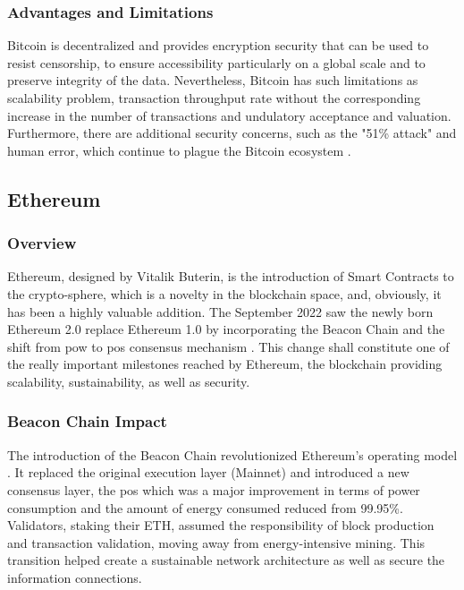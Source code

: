 \subsubsection{Advantages and Limitations}

Bitcoin is decentralized and provides encryption security that can be used to resist censorship, to ensure accessibility particularly on a global scale and to preserve integrity 
of the data. Nevertheless, Bitcoin has such limitations as scalability problem, transaction throughput rate without the corresponding increase in the number of transactions 
and undulatory acceptance and valuation. Furthermore, there are additional security concerns, such as the "51\% attack" and human error, which continue to plague the Bitcoin 
ecosystem \cite{9129332}.

\subsection{Ethereum} \label{subsec:ethereum}

\subsubsection{Overview}

Ethereum, designed by Vitalik Buterin, is the introduction of Smart Contracts to the crypto-sphere, which is a novelty in the blockchain space, and, obviously, it has been 
a highly valuable addition. The September 2022 saw the newly born Ethereum 2.0 replace Ethereum 1.0 by incorporating the Beacon Chain and the shift from \gls{pow} 
to \gls{pos} consensus mechanism \cite{ethereummerge}. This change shall constitute one of the really important milestones reached by Ethereum, the blockchain providing 
scalability, sustainability, as well as security.

\subsubsection{Beacon Chain Impact}

The introduction of the Beacon Chain revolutionized Ethereum's operating model \cite{ethereummerge}. It replaced the original execution layer (Mainnet) and introduced a new consensus layer, 
the \gls{pos} which was a major improvement in terms of power consumption and the amount of energy consumed reduced from 99.95\%. Validators, staking their ETH, assumed the 
responsibility of block production and transaction validation, moving away from energy-intensive mining. This transition helped create a sustainable network 
architecture as well as secure the information connections.

